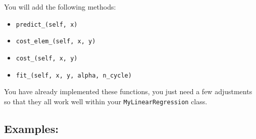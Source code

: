 \documentclass[]{article}
\begin{document}
You will add the following methods:

\begin{itemize}
\item
  \texttt{predict\_(self,\ x)}
\item
  \texttt{cost\_elem\_(self,\ x,\ y)}
\item
  \texttt{cost\_(self,\ x,\ y)}
\item
  \texttt{fit\_(self,\ x,\ y,\ alpha,\ n\_cycle)}
\end{itemize}

You have already implemented these functions, you just need a few
adjustments so that they all work well within your
\texttt{MyLinearRegression} class.

\hypertarget{examples}{%
\subsection{Examples:}\label{examples}}
\end{document}
